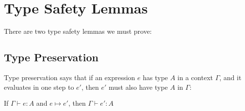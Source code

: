 \section{Type Safety Lemmas}
There are two type safety lemmas we must prove:

\subsection{Type Preservation} 
Type preservation says that if an expression $e$ has type $A$ in a context $\Gamma$, and it evaluates in one step to $e'$, then $e'$ must also have type $A$ in $\Gamma$:
\vspace{0.5cm}

\begin{thm}
 If $\Gamma \vdash e:A$ and $e \mapsto e'$, then $\Gamma \vdash e' : A$
\end{thm}


